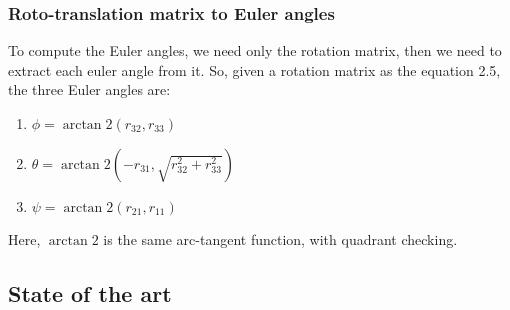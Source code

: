 \subsubsection*{Roto-translation matrix to Euler angles}
To compute the Euler angles, we need only the rotation matrix, then we need to extract each euler angle from it.
So, given a rotation matrix as the equation 2.5, the three Euler angles are:
\begin{enumerate}
    \item $\phi = \arctan2(r_{32}, r_{33})$
    \item $\theta = \arctan2(-r_{31}, \sqrt{r_{32}^2 + r_{33}^2})$
    \item $\psi = \arctan2(r_{21}, r_{11})$
\end{enumerate}
Here, $\arctan2$ is the same arc-tangent function, with quadrant checking.

\subsection{State of the art}\label{subsec:state-of-the-art}


